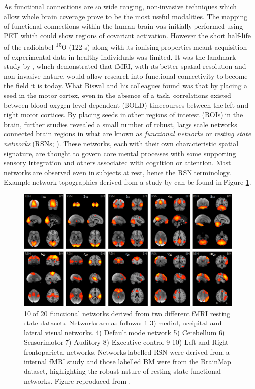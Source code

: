 As functional connections are so wide ranging, non-invasive techniques which allow whole brain coverage prove to be the most useful modalities. The mapping of functional connections within the human brain was initially performed using PET \citep{Friston1991,Friston1993} which could show regions of covariant activation. However the short half-life of the radiolabel \textsuperscript{15}O (122 s) along with its ionising properties meant acquisition of experimental data in healthy individuals was limited. It was the landmark study by \cite{Biswal1995}, which demonstrated that fMRI, with its better spatial resolution and non-invasive nature, would allow research into functional connectivity to become the field it is today. What Biswal and his colleagues found was that by placing a seed in the motor cortex, even in the absence of a task, correlations existed between blood oxygen level dependent (BOLD) timecourses between the left and right motor cortices. By placing seeds in other regions of interest (ROIs) in the brain, further studies revealed a small number of robust, large scale networks connected brain regions in what are known as \textit{functional networks} or \textit{resting state networks} (RSNs; \citealp{Corbetta1998,Raichle2001,Beckmann2005,Fox2005,Fox2007,Smith2009}). These networks, each with their own characteristic spatial signature, are thought to govern core mental processes with some supporting sensory integration and others associated with cognition or attention. Most networks are observed even in subjects at rest, hence the RSN terminology. Example network topographies derived from a study by \cite{Smith2009} can be found in Figure \ref{fig_intro_1}.


\begin{figure}
	\begin{center}
		\includegraphics[width=\linewidth]{./images/intro/smith.png}\caption{10 of 20 functional networks derived from two different fMRI resting state datasets. Networks are as follows: 1-3)  medial, occipital and lateral visual networks. 4) Default mode network 5) Cerebellum 6) Sensorimotor 7) Auditory 8) Executive control 9-10) Left and Right frontoparietal networks. Networks labelled RSN were derived from a internal fMRI study and those labelled BM were from the BrainMap \citep{Laird2005} dataset, highlighting the robust nature of resting state functional networks.  Figure reproduced from \cite{Smith2009}.}\label{fig_intro_1}
	\end{center}
\end{figure}

